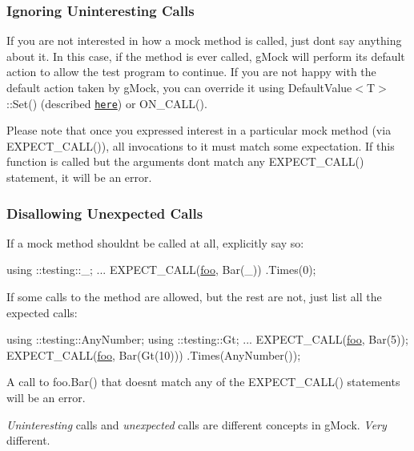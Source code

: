 \subsubsection*{Ignoring Uninteresting Calls}

If you are not interested in how a mock method is called, just don\textquotesingle{}t say anything about it. In this case, if the method is ever called, g\+Mock will perform its default action to allow the test program to continue. If you are not happy with the default action taken by g\+Mock, you can override it using {\ttfamily Default\+Value$<$T$>$\+::\+Set()} (described \href{#DefaultValue}{\tt here}) or {\ttfamily O\+N\+\_\+\+C\+A\+L\+L()}.

Please note that once you expressed interest in a particular mock method (via {\ttfamily E\+X\+P\+E\+C\+T\+\_\+\+C\+A\+L\+L()}), all invocations to it must match some expectation. If this function is called but the arguments don\textquotesingle{}t match any {\ttfamily E\+X\+P\+E\+C\+T\+\_\+\+C\+A\+L\+L()} statement, it will be an error.

\subsubsection*{Disallowing Unexpected Calls}

If a mock method shouldn\textquotesingle{}t be called at all, explicitly say so\+:


\begin{DoxyCode}
using ::testing::\_;
...
  EXPECT\_CALL(\mbox{\hyperlink{namespacefoo}{foo}}, Bar(\_))
      .Times(0);
\end{DoxyCode}


If some calls to the method are allowed, but the rest are not, just list all the expected calls\+:


\begin{DoxyCode}
using ::testing::AnyNumber;
using ::testing::Gt;
...
  EXPECT\_CALL(\mbox{\hyperlink{namespacefoo}{foo}}, Bar(5));
  EXPECT\_CALL(\mbox{\hyperlink{namespacefoo}{foo}}, Bar(Gt(10)))
      .Times(AnyNumber());
\end{DoxyCode}


A call to {\ttfamily foo.\+Bar()} that doesn\textquotesingle{}t match any of the {\ttfamily E\+X\+P\+E\+C\+T\+\_\+\+C\+A\+L\+L()} statements will be an error.

{\itshape Uninteresting} calls and {\itshape unexpected} calls are different concepts in g\+Mock. {\itshape Very} different.

